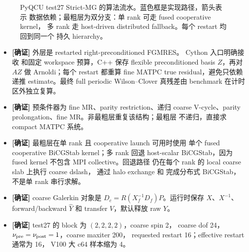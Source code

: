 \documentclass[UTF8,a4paper,11pt]{ctexart}
\newcommand{\code}[1]{\texttt{\detokenize{#1}}}
\newcommand{\confirmed}{\textcolor{evidencegreen}{\textbf{[确证]}}}
\begin{document}
\begin{figure}[htbp]
\caption{PyQCU test27 Strict-MG 的算法流水。蓝色框是实现路径，箭头表示
数据依赖；最粗层为双分支：单 rank 可走 fused cooperative kernel，
多 rank 走 host-driven distributed fallback。每个 restart 均回到同一个
持久 hierarchy。}
\label{fig:pyqcu-flow}
\end{figure}

\begin{itemize}[leftmargin=2em]
  \item \confirmed{} 外层是 restarted right-preconditioned FGMRES。
        Cython 入口明确接收 
        和固定 workspace 预算，C++ 保存 flexible preconditioned basis
        $Z$，再对 $AZ$ 做 Arnoldi；每个 restart 都重算 fine MATPC
        true residual，避免只依赖递推 estimate。最终 full periodic
        Wilson--Clover 真残差由 benchmark 在计时区外独立复算。
  \item \confirmed{} 预条件器为 fine MR、parity restriction、递归 coarse
        V-cycle、parity prolongation、fine MR。非最粗层重复该结构；最粗层
        不递归，直接求 compact MATPC 系统。
  \item \confirmed{} 最粗层在单 rank 且 cooperative launch 可用时使用
        单个 fused cooperative BiCGStab kernel；多 rank 回退 host-scalar
        BiCGStab，因为 fused kernel 不包含 MPI collective。回退路径
        仍在每个 rank 的 local coarse slab 上执行 coarse dslash，
        通过 halo exchange 和 \code{MPI_Allreduce} 完成分布式
        BiCGStab，不是单 rank 串行求解。
  \item \confirmed{} coarse Galerkin 对象是
        $D_{c}=R(X_f^{-1}D_f)P$。运行时保存 $X$、$X^{-1}$、
        forward/backward $\widehat Y$ 和 transfer $V$，默认释放 raw $Y$。
  \item \confirmed{} test27 的 block 为 $(2,2,2,2)$，coarse spin 2，
        coarse dof 24，$\nu_{\rm pre}=\nu_{\rm post}=1$，coarse maxiter 200，
        requested restart 16；effective restart 通常为 16，
        V100 大 c64 样本缩为 4。
\end{itemize}
\end{document}
